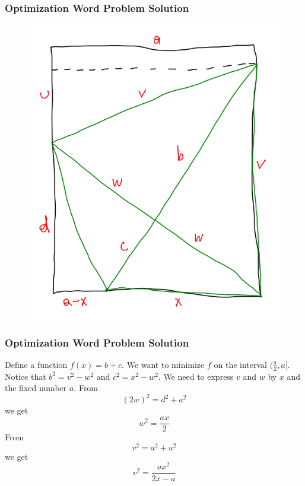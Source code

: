 \documentclass[xcolor=dvipsnames]{beamer}
\begin{document}
\begin{frame}
  \frametitle{Optimization Word Problem Solution}
  \begin{figure}[h]
    \includegraphics[scale=.35]{./diagrams/optleafsol.png}
  \end{figure}
\end{frame}

\begin{frame}
  \frametitle{Optimization Word Problem Solution}
Define a function $f(x)=b+c$. We want to minimize $f$ on the interval
$(\frac{a}{2},a]$. Notice that $b^{2}=v^{2}-w^{2}$ and
$c^{2}=x^{2}-w^{2}$. We need to express $v$ and $w$ by $x$ and the
fixed number $a$. From
\begin{equation}
  \label{eq:jaithean}
  \left(2w\right)^{2}=d^{2}+a^{2}
\end{equation}
we get
\begin{equation}
  \label{eq:ukohyaej}
  w^{2}=\frac{ax}{2}
\end{equation}
From
\begin{equation}
  \label{eq:loocootu}
  v^{2}=a^{2}+u^{2}
\end{equation}
we get
\begin{equation}
  \label{eq:zoojeefo}
  v^{2}=\frac{ax^{2}}{2x-a}
\end{equation}
\end{frame}
\end{document}
